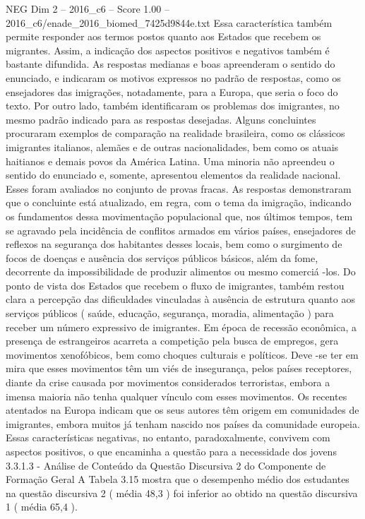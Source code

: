 \begin{textsample}{NEG Dim 2 – 2016\_c6 – Score 1.00 – 2016\_c6/enade\_2016\_biomed\_7425d9844e.txt}
Essa característica também permite responder aos termos postos quanto aos Estados que recebem os migrantes.
Assim, a indicação dos aspectos positivos e negativos também é bastante difundida.
As respostas medianas e boas apreenderam o sentido do enunciado, e indicaram os motivos expressos no padrão de respostas, como os ensejadores das imigrações, notadamente, para a Europa, que seria o foco do texto.
Por outro lado, também identificaram os problemas dos imigrantes, no mesmo padrão indicado para as respostas desejadas.
Alguns concluintes procuraram exemplos de comparação na realidade brasileira, como os clássicos imigrantes italianos, alemães e de outras nacionalidades, bem como os atuais haitianos e demais povos da América Latina.
Uma minoria não apreendeu o sentido do enunciado e, somente, apresentou elementos da realidade nacional.
Esses foram avaliados no conjunto de provas fracas.
As respostas demonstraram que o concluinte está atualizado, em regra, com o tema da imigração, indicando os fundamentos dessa movimentação populacional que, nos últimos tempos, tem se agravado pela incidência de conflitos armados em vários países, ensejadores de reflexos na segurança dos habitantes desses locais, bem como o surgimento de focos de doenças e ausência dos serviços públicos básicos, além da fome, decorrente da impossibilidade de produzir alimentos ou mesmo comerciá -los.
Do ponto de vista dos Estados que recebem o fluxo de imigrantes, também restou clara a percepção das dificuldades vinculadas à ausência de estrutura quanto aos serviços públicos ( saúde, educação, segurança, moradia, alimentação ) para receber um número expressivo de imigrantes.
Em época de recessão econômica, a presença de estrangeiros acarreta a competição pela busca de empregos, gera movimentos xenofóbicos, bem como choques culturais e políticos.
Deve -se ter em mira que esses movimentos têm um viés de insegurança, pelos países receptores, diante da crise causada por movimentos considerados terroristas, embora a imensa maioria não tenha qualquer vínculo com esses movimentos.
Os recentes atentados na Europa indicam que os seus autores têm origem em comunidades de imigrantes, embora muitos já tenham nascido nos países da comunidade europeia.
Essas características negativas, no entanto, paradoxalmente, convivem com aspectos positivos, o que encaminha a questão para a necessidade dos jovens 3.3.1.3 - Análise de Conteúdo da Questão Discursiva 2 do Componente de Formação Geral A Tabela 3.15 mostra que o desempenho médio dos estudantes na questão discursiva 2 ( média 48,3 ) foi inferior ao obtido na questão discursiva 1 ( média 65,4 ).

\end{textsample}

